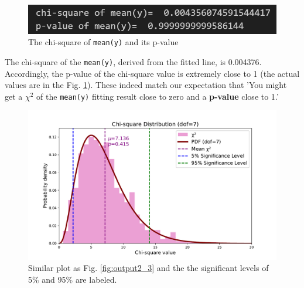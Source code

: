 \documentclass[12pt,a4paper]{article}
\begin{document}
\begin{CJK}{UTF8}{bkai}

\begin{figure}[h]
    \centering
    \includegraphics[width=0.8\linewidth]{figures/output/practice_2/output2_3.png}
    \caption{The chi-square of \texttt{mean(y)} and its p-value}
    \label{fig:chisq_p}
\end{figure}

The chi-square of the \texttt{mean(y)}, derived from the fitted line, is 0.004376. Accordingly, the p-value of the chi-square value is extremely close to 1 (the actual values are in the Fig. \ref{fig:chisq_p}). These indeed match our expectation that 'You might get a $\chi^2$ of the \texttt{mean(y)} fitting result close to zero and a \textbf{p-value} close to 1.'

\begin{figure}[h]
    \centering
    \includegraphics[width=1\linewidth]{figures/output/practice_2/output2_4.pdf}
    \caption{Similar plot as Fig. \ref{fig:output2_3} and the the significant levels of 5\% and 95\% are labeled.}
    \label{fig:output2_4}
\end{figure}



\end{CJK}
\end{document}
